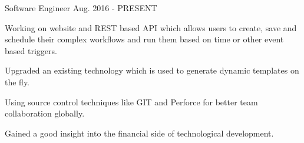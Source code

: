 


\begin{cventries}
	
	\cvmyentry
	{Software Engineer} %
	{Aug. 2016 - PRESENT} %
	{
		\begin{cvitems} %
			\item {Working on website and REST based API which allows users to create, save and schedule their complex workflows and run them based on time or other event based triggers.}
			\item {Upgraded an existing technology which is used to generate dynamic templates on the fly.}
			\item {Using source control techniques like GIT and Perforce for better team collaboration globally.}
			\item {Gained a good insight into the financial side of technological development.}
		\end{cvitems}
	}
	
\end{cventries}
